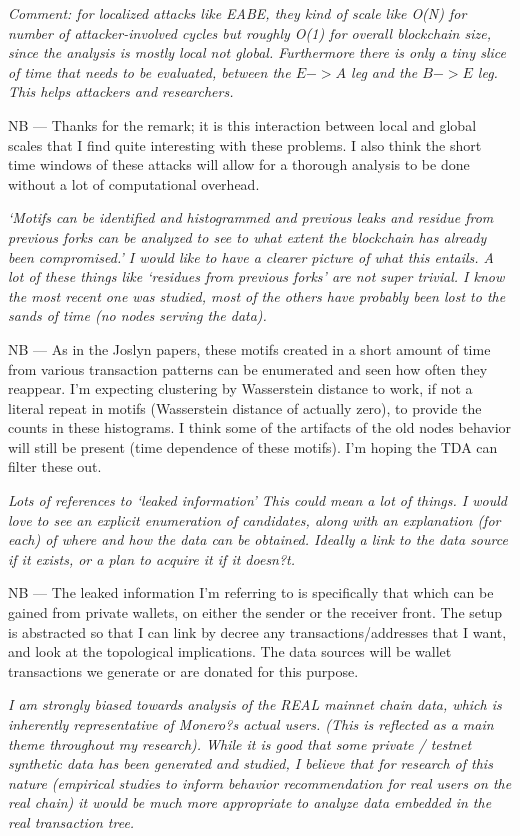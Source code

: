 \documentclass[prc, 12pt]{revtex4-1}
\begin{document}
\textit{Comment: for localized attacks like EABE, they kind of scale like O(N) for number of attacker-involved cycles but roughly O(1) for overall blockchain size, since the analysis is mostly local not global. Furthermore there is only a tiny slice of time that needs to be evaluated, between the $E->A$ leg and the $B->E$ leg. This helps attackers and researchers.}

NB --- Thanks for the remark; it is this interaction between local and global scales that I find quite interesting with these problems.  I also think the short time windows of these attacks will allow for a thorough analysis to be done without a lot of computational overhead.

\textit{`Motifs can be identified and histogrammed and previous leaks and residue from previous forks can be analyzed to see to what extent the blockchain has already been compromised.' I would like to have a clearer picture of what this entails. A lot of these things like `residues from previous forks' are not super trivial. I know the most recent one was studied, most of the others have probably been lost to the sands of time (no nodes serving the data).}

NB ---  As in the Joslyn papers, these motifs created in a short amount of time from various transaction patterns can be enumerated and seen how often they reappear.  I'm expecting clustering by Wasserstein distance to work, if not a literal repeat in motifs (Wasserstein distance of actually zero), to provide the counts in these histograms.  I think some of the artifacts of the old nodes behavior will still be present (time dependence of these motifs).  I'm hoping the TDA can filter these out.

\textit{Lots of references to `leaked information' This could mean a lot of things. I would love to see an explicit enumeration of candidates, along with an explanation (for each) of where and how the data can be obtained. Ideally a link to the data source if it exists, or a plan to acquire it if it doesn?t.}

NB --- The leaked information I'm referring to is specifically that which can be gained from private wallets, on either the sender or the receiver front.  The setup is abstracted so that I can link by decree any transactions/addresses that I want, and look at the topological implications.  The data sources will be wallet transactions we generate or are donated for this purpose.

\textit{I am strongly biased towards analysis of the REAL mainnet chain data, which is inherently representative of Monero?s actual users. (This is reflected as a main theme throughout my research). While it is good that some private / testnet synthetic data has been generated and studied, I believe that for research of this nature (empirical studies to inform behavior recommendation for real users on the real chain) it would be much more appropriate to analyze data embedded in the real transaction tree.}
\end{document}
